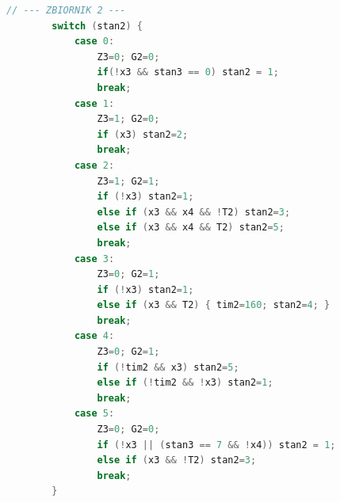 \documentclass[12pt,oneside]{article}
\begin{document}
\begin{lstlisting}[language=C, caption={Pełny kod źródłowy projektu}, label={Kod:calosc}]
        // --- ZBIORNIK 2 ---
        switch (stan2) {
            case 0: 
                Z3=0; G2=0; 
                if(!x3 && stan3 == 0) stan2 = 1; 
                break;
            case 1: 
                Z3=1; G2=0; 
                if (x3) stan2=2; 
                break;
            case 2: 
                Z3=1; G2=1; 
                if (!x3) stan2=1; 
                else if (x3 && x4 && !T2) stan2=3; 
                else if (x3 && x4 && T2) stan2=5; 
                break;
            case 3: 
                Z3=0; G2=1; 
                if (!x3) stan2=1; 
                else if (x3 && T2) { tim2=160; stan2=4; } 
                break;
            case 4: 
                Z3=0; G2=1; 
                if (!tim2 && x3) stan2=5; 
                else if (!tim2 && !x3) stan2=1; 
                break;
            case 5: 
                Z3=0; G2=0; 
                if (!x3 || (stan3 == 7 && !x4)) stan2 = 1; 
                else if (x3 && !T2) stan2=3; 
                break;
        }
        

\end{lstlisting}
\end{document}
